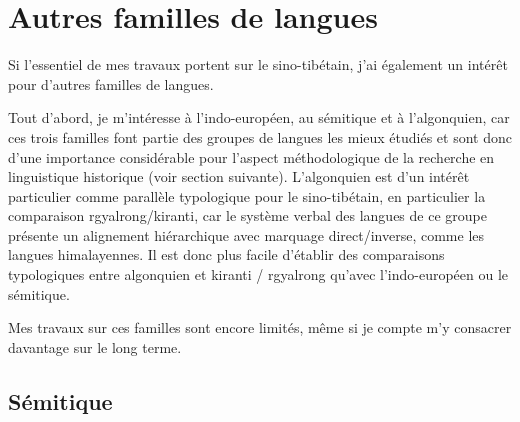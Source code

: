 \documentclass[oldfontcommands,oneside,a4paper,11pt]{memoir}
\begin{document}
\chapter{Autres familles de langues}
Si l'essentiel de mes travaux portent sur le sino-tibétain, j'ai également un intérêt pour d'autres familles de langues. 

Tout d'abord, je m'intéresse à l'indo-européen, au sémitique et à l'algonquien, car ces trois familles font partie des groupes de langues les mieux étudiés et sont donc d'une importance considérable pour l'aspect méthodologique de la recherche en linguistique historique (voir section suivante). L'algonquien est d'un intérêt particulier comme parallèle typologique pour le sino-tibétain, en particulier la comparaison rgyalrong/kiranti, car le système verbal des langues de ce groupe présente un alignement hiérarchique avec marquage direct/inverse, comme les langues himalayennes. Il est donc plus facile d'établir des comparaisons typologiques entre algonquien et kiranti / rgyalrong qu'avec l'indo-européen ou le sémitique. 

Mes travaux sur ces familles sont encore limités, même si je compte m'y consacrer davantage sur le long terme. 


\section{Sémitique}
\end{document}
